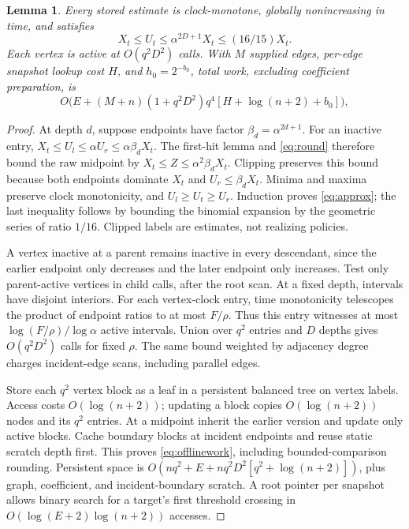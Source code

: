\documentclass[acmsmall,11pt,screen,nonacm]{acmart}
\newtheorem{lemma}[theorem]{Lemma}
\begin{document}
\begin{lemma}\label{lem:offline}
Every stored estimate is clock-monotone, globally nonincreasing in time, and satisfies
\begin{equation}\label{eq:approx}
 X_t\le U_t\le\alpha^{2D+1}X_t\le(16/15)X_t.
\end{equation}
Each vertex is active at $O(q^2D^2)$ calls. With $M$ supplied edges, per-edge snapshot lookup cost $H$, and $h_0=2^{-b_0}$, total work, excluding coefficient preparation, is
\begin{equation}\label{eq:offlinework}
 O\big(E+(M+n)(1+q^2D^2)q^4[H+\log(n+2)+b_0]\big),
\end{equation}
\end{lemma}
\begin{proof}
At depth $d$, suppose endpoints have factor $\beta_d=\alpha^{2d+1}$. For an inactive entry,
$X_t\le U_l\le\alpha U_r\le\alpha\beta_dX_t$.
The first-hit lemma and \eqref{eq:round} therefore bound the raw midpoint by $X_t\le Z\le\alpha^2\beta_dX_t$. Clipping preserves this bound because both endpoints dominate $X_t$ and $U_r\le\beta_dX_t$. Minima and maxima preserve clock monotonicity, and $U_l\ge U_t\ge U_r$. Induction proves \eqref{eq:approx}; the last inequality follows by bounding the binomial expansion by the geometric series of ratio $1/16$. Clipped labels are estimates, not realizing policies.

A vertex inactive at a parent remains inactive in every descendant, since the earlier endpoint only decreases and the later endpoint only increases. Test only parent-active vertices in child calls, after the root scan. At a fixed depth, intervals have disjoint interiors. For each vertex-clock entry, time monotonicity telescopes the product of endpoint ratios to at most $F/\rho$. Thus this entry witnesses at most $\log(F/\rho)/\log\alpha$ active intervals. Union over $q^2$ entries and $D$ depths gives $O(q^2D^2)$ calls for fixed $\rho$. The same bound weighted by adjacency degree charges incident-edge scans, including parallel edges.

Store each $q^2$ vertex block as a leaf in a persistent balanced tree on vertex labels. Access costs $O(\log(n+2))$; updating a block copies $O(\log(n+2))$ nodes and its $q^2$ entries. At a midpoint inherit the earlier version and update only active blocks. Cache boundary blocks at incident endpoints and reuse static scratch depth first. This proves \eqref{eq:offlinework}, including bounded-comparison rounding. Persistent space is
$O(nq^2+E+nq^2D^2[q^2+\log(n+2)])$, plus graph, coefficient, and incident-boundary scratch. A root pointer per snapshot allows binary search for a target's first threshold crossing in $O(\log(E+2)\log(n+2))$ accesses.
\end{proof}
\end{document}
